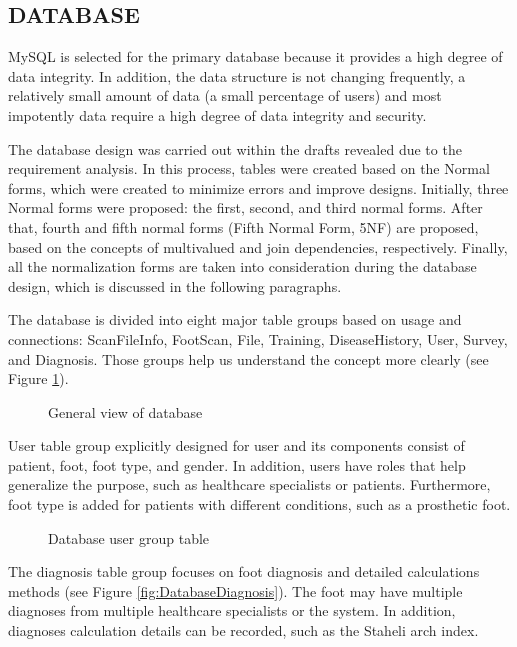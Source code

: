\subsection{DATABASE} \label{sec:StudyIDatabase}

MySQL is selected for the primary database because it provides a high degree of data integrity. In addition, the data structure is not changing frequently, a relatively small amount of data (a small percentage of users) and most impotently data require a high degree of data integrity and security.

The database design was carried out within the drafts revealed due to the requirement analysis. In this process, tables were created based on the Normal forms, which were created to minimize errors and improve designs. Initially, three Normal forms were proposed: the first, second, and third normal forms. After that, fourth and fifth normal forms (Fifth Normal Form, 5NF) are proposed, based on the concepts of multivalued and join dependencies, respectively. Finally, all the normalization forms are taken into consideration during the database design, which is discussed in the following paragraphs.

The database is divided into eight major table groups based on usage and connections: ScanFileInfo, FootScan, File, Training, DiseaseHistory, User, Survey, and Diagnosis. Those groups help us understand the concept more clearly (see Figure \ref{fig:DatabaseGeneralView}). 

\begin{figure}[htbp]
\centering
{}
\caption{General view of database}
\label{fig:DatabaseGeneralView}
\end{figure}

User table group explicitly designed for user and its components consist of patient, foot, foot type, and gender. In addition, users have roles that help generalize the purpose, such as healthcare specialists or patients. Furthermore,  foot type is added for patients with different conditions, such as a prosthetic foot. 

\begin{figure}[htbp]
\centering
{}
\caption{Database user group table}
\label{fig:DatabaseUser}
\end{figure}

The diagnosis table group focuses on foot diagnosis and detailed calculations methods (see Figure \ref{fig:DatabaseDiagnosis}). The foot may have multiple diagnoses from multiple healthcare specialists or the system. In addition, diagnoses calculation details can be recorded, such as the Staheli arch index.

